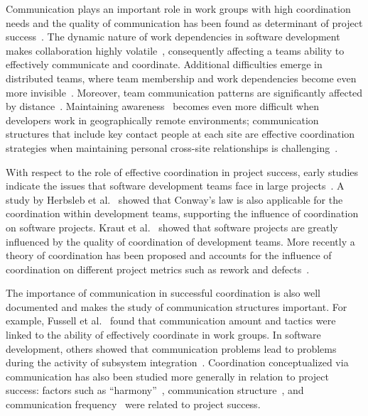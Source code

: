 Communication plays an important role in work groups with high coordination needs
and the quality of communication has been found as determinant of project
success~\cite{curtis:acm:1988,kraut:1995coordination}. The dynamic nature
of work dependencies in software development makes collaboration highly
volatile~\cite{Cataldo:2007hb}, consequently affecting a teams ability to
effectively communicate and coordinate. Additional difficulties emerge in
distributed teams, where team membership and work dependencies become even more
invisible~\cite{damian:icgse:2007}. Moreover, team communication patterns are
significantly affected by distance~\cite{hinds:cscw:2006}. Maintaining
awareness~\cite{sarma:2006icgse} becomes even more difficult when developers work
in geographically remote environments; communication structures that include key
contact people at each site are effective coordination strategies when
maintaining personal cross-site relationships is challenging~\cite{hinds:cscw:2006}.

With respect to the role of effective coordination in project success, early
studies indicate the issues that software development teams face in large
projects~\cite{curtis:acm:1988}. A study by Herbsleb et
al.~\cite{Herbsleb:1999ew} showed that Conway's law is also applicable for the
coordination within development teams, supporting the influence of coordination
on software projects. Kraut et al.~\cite{kraut:1995coordination} showed that
software projects are greatly influenced by the quality of coordination of
development teams. More recently a theory of coordination has been proposed and
accounts for the influence of coordination on different project metrics such as
rework and defects~\cite{Herbsleb:2006vn}.


The importance of communication in successful coordination is also well
documented and makes the study of communication structures important. For
example, Fussell et al.~\cite{fussell:cscw:1998} found that communication amount and
tactics were linked to the ability of effectively coordinate in work groups. In
software development, others showed that communication problems lead to problems
during the activity of subsystem
integration~\cite{Grinter:1999geography,deSouza2004:thwarts_collaboration}. Coordination
conceptualized via communication has also been studied more generally in relation
to project success: factors such as ``harmony''~\cite{Souder:1988jpim},
communication structure~\cite{Robin:1990jpim}, and communication
frequency~\cite{Griffin:1992ms} were related to project success.

